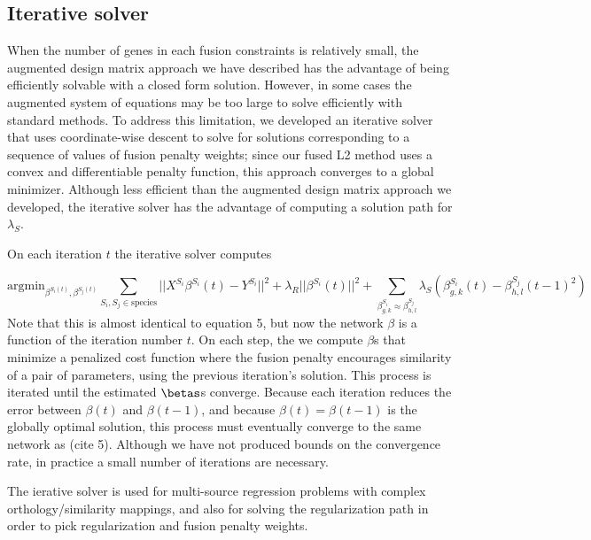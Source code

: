 \documentclass[11pt]{article}
\begin{document}
\subsection{Iterative solver}

When the number of genes in each fusion constraints is relatively small, the augmented design matrix approach we have described has the advantage of being efficiently solvable with a closed form solution. However, in some cases the augmented system of equations may be too large to solve efficiently with standard methods. To address this limitation, we developed an iterative solver that uses coordinate-wise descent to solve for solutions corresponding to a sequence of values of fusion penalty weights; since our fused L2 method uses a convex and differentiable penalty function, this approach converges to a global minimizer. Although less efficient than the augmented design matrix approach we developed, the iterative solver has the advantage of computing a solution path for $\lambda_S$.

On each iteration $t$ the iterative solver computes


\begin{equation}
\text{argmin}_{\beta^{S_i(t)}, \beta^{S_j(t)}} \displaystyle\sum_{S_i, S_j \in \text{species}} ||X^{S_i}\beta^{S_i}(t) - Y^{S_i}||^2 + \lambda_R||\beta^{S_i}(t)||^2 + \displaystyle \sum_{\beta_{g,k}^{S_i} \approx \beta_{h,l}^{S_j}} \lambda_S(\beta^{S_i}_{g,k}(t) - \beta_{h,l}^{S_j}(t-1)^2)
\end{equation}
Note that this is almost identical to equation 5, but now the network $\beta$ is a function of the iteration number $t$. On each step, the we compute $\beta$s that minimize a penalized cost function where the fusion penalty encourages similarity of a pair of parameters, using the previous iteration's solution. This process is iterated until the estimated $\betas$s converge. Because each iteration reduces the error between $\beta(t)$ and $\beta(t-1)$, and because $\beta(t) = \beta(t-1)$ is the globally optimal solution, this process must eventually converge to the same network as (cite 5). Although we have not produced bounds on the convergence rate, in practice a small number of iterations are necessary.

The ierative solver is used for multi-source regression problems with complex orthology/similarity mappings, and also for solving the regularization path in order to pick regularization and fusion penalty weights. 
\end{document}
